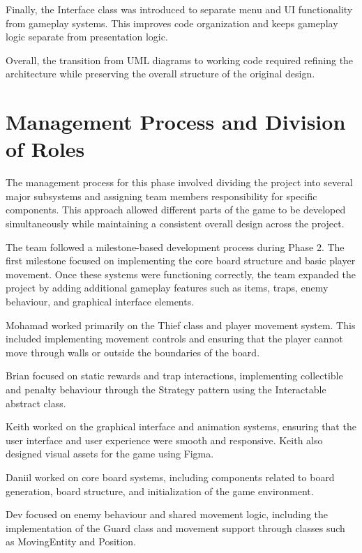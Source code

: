 \documentclass[12pt]{article}
\begin{document}
Finally, the Interface class was introduced to separate menu and UI functionality from gameplay systems. This improves code organization and keeps gameplay logic separate from presentation logic.

Overall, the transition from UML diagrams to working code required refining the architecture while preserving the overall structure of the original design.

\section{Management Process and Division of Roles}

The management process for this phase involved dividing the project into several major subsystems and assigning team members responsibility for specific components. This approach allowed different parts of the game to be developed simultaneously while maintaining a consistent overall design across the project.

The team followed a milestone-based development process during Phase 2. The first milestone focused on implementing the core board structure and basic player movement. Once these systems were functioning correctly, the team expanded the project by adding additional gameplay features such as items, traps, enemy behaviour, and graphical interface elements.

Mohamad worked primarily on the Thief class and player movement system. This included implementing movement controls and ensuring that the player cannot move through walls or outside the boundaries of the board.

Brian focused on static rewards and trap interactions, implementing collectible and penalty behaviour through the Strategy pattern using the Interactable abstract class.

Keith worked on the graphical interface and animation systems, ensuring that the user interface and user experience were smooth and responsive. Keith also designed visual assets for the game using Figma.

Daniil worked on core board systems, including components related to board generation, board structure, and initialization of the game environment.

Dev focused on enemy behaviour and shared movement logic, including the implementation of the Guard class and movement support through classes such as MovingEntity and Position.
\end{document}
